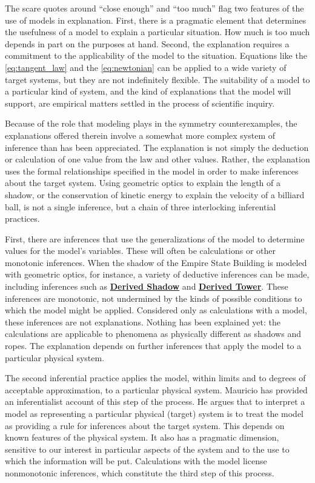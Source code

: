\documentclass[natbib]{svjour3}                     %
\newcounter{fncntr}
\newcommand{\fnmark}[1]{\refstepcounter{fncntr}\label{#1}\footnotemark[\getrefnumber{#1}]}
\begin{document}
The scare quotes around ``close enough'' and ``too much'' flag two features of the use of models in explanation.  First, there is a pragmatic element that determines the usefulness of a model to explain a particular situation.  How much is too much depends in part on the purposes at hand.  Second, the explanation requires a commitment to the applicability of the model to the situation.  Equations like the \ref{eq:tangent_law} and the \ref{eq:newtonian} can be applied to a wide variety of target systems, but they are not indefinitely flexible.  The suitability of a model to a particular kind of system, and the kind of explanations that the model will support, are empirical matters settled in the process of scientific inquiry.

Because of the role that modeling plays in the symmetry counterexamples, the explanations offered therein involve a somewhat more complex system of inference than has been appreciated.  The explanation is not simply the deduction or calculation of one value from the law and other values.  Rather, the explanation uses the formal relationships specified in the model in order to make inferences about the target system.  Using geometric optics to explain the length of a shadow, or the conservation of kinetic energy to explain the velocity of a billiard ball, is not a single inference, but a chain of three interlocking inferential practices.

First, there are inferences that use the generalizations of the model to determine values for the model's variables.  These will often be calculations or other monotonic inferences. When the shadow of the Empire State Building is modeled with geometric optics, for instance, a variety of deductive inferences can be made, including inferences such as \hyperref[eq:shadow_expl]{\textbf{Derived Shadow}} and \hyperref[eq:height_expl]{\textbf{Derived Tower}}. These inferences are monotonic, not undermined by the kinds of possible conditions to which the model might be applied.  Considered only as calculations with a model, these inferences are not explanations.  Nothing has been explained yet: the calculations are applicable to phenomena as physically different as shadows and ropes.  The explanation depends on further inferences that apply the model to a particular physical system.

The second inferential practice applies the model, within limits and to degrees of acceptable approximation, to a particular physical system. Mauricio \cite{Suarez2003,Suarez2004} has provided an inferentialist account of this step of the process.  He argues that to interpret a model as representing a particular physical (target) system is to treat the model as providing a rule for inferences about the target system. This depends on known features of the physical system. It also has a pragmatic dimension, sensitive to our interest in particular aspects of the system and to the use to which the information will be put. Calculations with the model license nonmonotonic inferences, which constitute the third step of this process.
\end{document}
